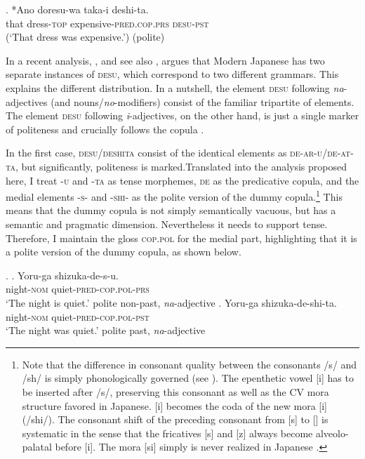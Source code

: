 \documentclass [output=book,colorlinks,citecolor=brown]{langscibook}
\begin{document}
\exg. *Ano doresu-wa taka-i deshi-ta.\\
that dress-\textsc{top} expensive-\textsc{pred.cop.prs} \textsc{desu}-\textsc{pst}\\
(`That dress was expensive.’) (polite)

In a recent analysis, \citet{yamada:2023:looking}, and see also \citet{miyagawa:2022:syntax}, argues that Modern Japanese has two separate instances of \textsc{desu}, which correspond to two different grammars. This explains the different distribution. In a nutshell, the element \textsc{desu} following \textit{na}-adjectives (and nouns/\textit{no}-modifiers) consist of the familiar tripartite of elements. The element \textsc{desu} following \textit{i}-adjectives, on the other hand, is just a single marker of politeness and crucially follows the copula \citep[2–4]{yamada:2023:looking}. %

In the first case, \textsc{desu/deshita} consist of the identical elements as \textsc{de-ar-u/de-at-ta}, but significantly, politeness is marked.Translated into the analysis proposed here, I treat -\textsc{u} and -\textsc{ta} as tense morphemes, \textsc{de} as the predicative copula, and the medial elements -\textsc{s}- and -\textsc{shi}- as the polite version of the dummy copula.\footnote{Note that the difference in consonant quality between the consonants /s/ and /sh/ is simply phonologically governed (see \citealt{ito:2015:word}). The epenthetic vowel [i] has to be inserted after /s/, preserving this consonant as well as the CV mora structure favored in Japanese. [i] becomes the coda of the new mora [\textctc i] (/shi/). The consonant shift of the preceding consonant from [s] to [\textctc] is systematic in the sense that the fricatives [s] and [z] always become alveolo-palatal before [i]. The mora [si] simply is never realized in Japanese \citep{lewin:1989:sprache, vance:2008:sounds}.} This means that the dummy copula is not simply semantically vacuous, but has a semantic and pragmatic dimension. Nevertheless it needs to support tense. Therefore, I maintain the gloss \textsc{cop.pol} for the medial part, highlighting that it is a polite version of the dummy copula, as shown below. %

\ex. \ag. Yoru-ga shizuka-de-s-u.\\
night-\textsc{nom} quiet-\textsc{pred-cop.pol-prs}\\
`The night is quiet.' \null \hfill polite non-past, \textit{na}-adjective
\bg. Yoru-ga shizuka-de-shi-ta.\\
night-\textsc{nom} quiet-\textsc{pred-cop.pol-pst}\\
`The night was quiet.' \null \hfill polite past, \textit{na}-adjective
\end{document}
